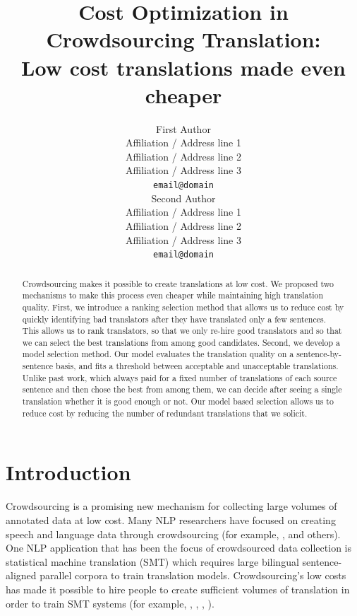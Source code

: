 \documentclass[11pt,letterpaper]{article}
\title{Cost Optimization in Crowdsourcing Translation:\\ Low cost translations made even cheaper}
\author{First Author \\
  Affiliation / Address line 1 \\
  Affiliation / Address line 2 \\
  Affiliation / Address line 3 \\
  {\tt email@domain} \\\And
  Second Author \\
  Affiliation / Address line 1 \\
  Affiliation / Address line 2 \\
  Affiliation / Address line 3 \\
  {\tt email@domain} \\}
\date{}
\begin{document}
\maketitle
\begin{abstract}
Crowdsourcing makes it possible to create translations at low cost. We proposed two mechanisms to make this process even cheaper while maintaining high translation quality.
First, we introduce a ranking selection method that allows us to reduce cost by quickly identifying bad translators after they have translated only a few sentences.  This allows us to rank translators, so that we only re-hire good translators and so that we can select the best translations from among good candidates. Second, we develop a model selection method.  Our model evaluates the translation quality on a sentence-by-sentence basis, and fits a threshold between acceptable and unacceptable translations.   Unlike past work, which always paid for a fixed number of translations of each source sentence and then chose the best from among them, we can decide after seeing a single translation whether it is good enough or not. Our model based selection allows us to reduce cost by reducing the number of redundant translations that we solicit. 
 \end{abstract}

\section{Introduction}

Crowdsourcing is a promising new mechanism for collecting large volumes of annotated data at low cost.  %
Many NLP researchers have focused on creating speech and language data through crowdsourcing (for example,  ,  and others).  One NLP application that has been the focus of crowdsourced data collection is statistical machine translation (SMT) which requires large bilingual sentence-aligned parallel corpora to train translation models.  Crowdsourcing's low costs has made it possible to hire people to create sufficient volumes of translation in order to train SMT systems (for example,   ,  ,  , ).
\end{document}
